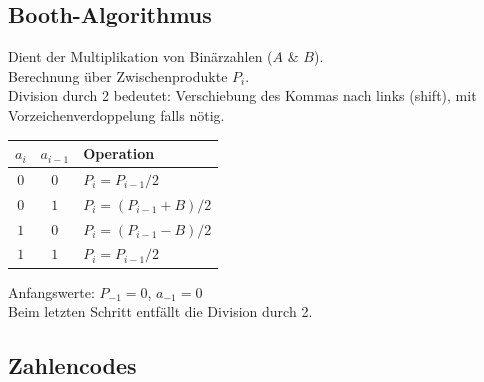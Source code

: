 \subsection{Booth-Algorithmus}
Dient der Multiplikation von Binärzahlen ($A$ \& $B$).\\
Berechnung über Zwischenprodukte $P_i$.\\
Division durch 2 bedeutet: Verschiebung des Kommas nach links (shift), mit Vorzeichenverdoppelung falls nötig.
\begin{center}
    \begin{tabular}{c c l}
        $a_i$ & $a_{i - 1}$ & Operation\\
        \hline
        $0$ & $0$ & $P_i = P_{i-1}/2$\\
        $0$ & $1$ & $P_i = (P_{i-1} + B)/2$\\
        $1$ & $0$ & $P_i = (P_{i-1} - B)/2$\\
        $1$ & $1$ & $P_i = P_{i-1}/2$\\
    \end{tabular}
\end{center}
Anfangswerte: $P_{-1} = 0$, $a_{-1} = 0$\\
Beim letzten Schritt entfällt die Division durch 2.

\subsection{Zahlencodes}
\begin{center}
\end{center}

